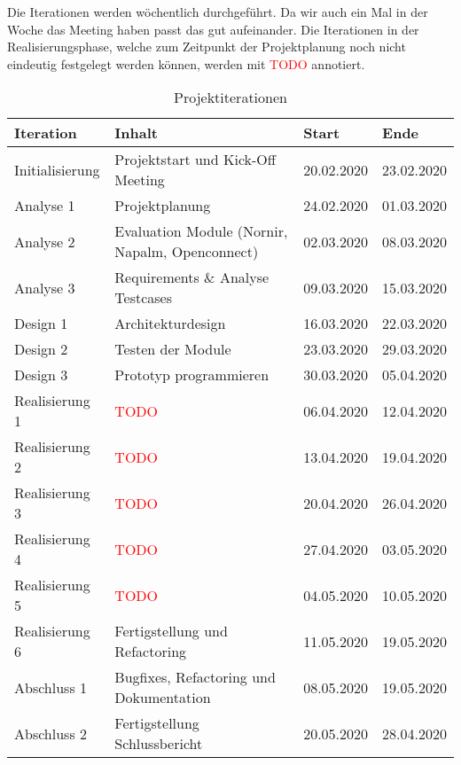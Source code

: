 \documentclass[
	ngerman,
	toc=listof, %
	toc=bibliography, %
	footnotes=multiple, %
	parskip=half, %
	numbers=noendperiod %
]{scrartcl}
\begin{document}
		Die Iterationen werden wöchentlich durchgeführt.
		Da wir auch ein Mal in der Woche das Meeting haben passt das gut aufeinander.
		Die Iterationen in der Realisierungsphase, welche zum Zeitpunkt der Projektplanung noch nicht eindeutig festgelegt werden können, werden mit \textcolor{red}{TODO} annotiert.

		\begin{table}[!h]
			\begin{tabularx}{\textwidth}{lXll}
				\toprule
				Iteration & Inhalt & Start & Ende \\
				\midrule
				Initialisierung & Projektstart und Kick-Off Meeting & 20.02.2020 & 23.02.2020 \\
				Analyse 1 & Projektplanung & 24.02.2020 & 01.03.2020 \\
				Analyse 2 & Evaluation Module (Nornir, Napalm, Openconnect) & 02.03.2020 & 08.03.2020 \\
				Analyse 3 & Requirements \& Analyse Testcases & 09.03.2020 & 15.03.2020 \\
				Design 1 & Architekturdesign & 16.03.2020 & 22.03.2020 \\
				Design 2 & Testen der Module & 23.03.2020 & 29.03.2020 \\
				Design 3 & Prototyp programmieren & 30.03.2020 & 05.04.2020 \\
				Realisierung 1 & \textcolor{red}{TODO} & 06.04.2020 & 12.04.2020 \\
				Realisierung 2 & \textcolor{red}{TODO} & 13.04.2020 & 19.04.2020 \\
				Realisierung 3 & \textcolor{red}{TODO} & 20.04.2020 & 26.04.2020 \\
				Realisierung 4 & \textcolor{red}{TODO} & 27.04.2020 & 03.05.2020 \\
				Realisierung 5 & \textcolor{red}{TODO} & 04.05.2020 & 10.05.2020 \\
				Realisierung 6 & Fertigstellung und Refactoring & 11.05.2020 & 19.05.2020 \\
				Abschluss 1 & Bugfixes, Refactoring und Dokumentation & 08.05.2020 & 19.05.2020\\
				Abschluss 2 & Fertigstellung Schlussbericht & 20.05.2020 & 28.04.2020\\
				\bottomrule
			\end{tabularx}
			\caption{Projektiterationen}
		\end{table}
\end{document}
